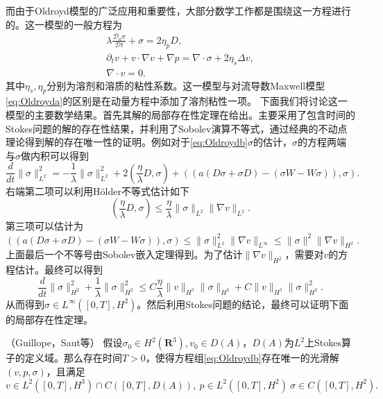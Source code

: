 而由于Oldroyd模型的广泛应用和重要性，大部分数学工作都是围绕这一方程进行的。这一模型的一般方程为
\begin{subequations}\label{eq:Oldroydb}
\begin{align}
	\lambda \frac{\mathcal{D}_a \sigma}{\mathcal{D} t} + \sigma = 2 \eta_p D, \\
	\partial_t v + v \cdot \nabla v  + \nabla p = \nabla \cdot \sigma + 2 \eta_s \Delta v, \\
	\nabla \cdot v = 0.
\end{align}
\end{subequations}
其中$\eta_s,\eta_p$分别为溶剂和溶质的粘性系数。这一模型与对流导数Maxwell模型\eqref{eq:Oldroyda}的区别是在动量方程中添加了溶剂粘性一项。
下面我们将讨论这一模型的主要数学结果。首先其解的局部存在性定理在\cite{guillope1990existence}给出。主要采用了包含时间的Stokes问题的解的存在性结果\cite{temam1995navier}，并利用了Sobolev演算不等式\cite{majda2012compressible}，通过经典的不动点理论得到解的存在唯一性的证明。例如对于\eqref{eq:Oldroydb}$\sigma$的估计，$\sigma$的方程两端与$\sigma$做内积可以得到
\begin{equation*}
	\frac{d}{dt} \|\sigma\|_{L^2}^2  =  -\frac{1}{\lambda} \|\sigma\|_{L^2}^2 + 2 (\frac{\eta}{\lambda} D, \sigma) + \left( (a(D \sigma + \sigma D) - (\sigma W -W \sigma)),\sigma \right).
\end{equation*}
右端第二项可以利用H\"older不等式估计如下
\begin{equation*}
	(\frac{\eta}{\lambda} D, \sigma) \le \frac{\eta}{\lambda} \|\sigma\|_{L^2} \|\nabla v\|_{L^2}.
\end{equation*}
第三项可以估计为
\begin{equation*}
	 \left( (a(D \sigma + \sigma D) - (\sigma W -W \sigma)),\sigma \right) \le \|\sigma\|_{L^2}^2 \|\nabla v\|_{L^\infty} \le \|\sigma\|^2 \|\nabla v\|_{H^2}
.
\end{equation*}
上面最后一个不等号由Sobolev嵌入定理得到。为了估计$\|\nabla v\|_{H^2}$，需要对$v$的方程估计。最终可以得到\cite{guillope1990existence}
\begin{equation*}
		\frac{d}{dt} \|\sigma\|_{H^2}^2 + \frac{1}{\lambda} \|\sigma\|_{H^2}^2 \le C \frac{\eta}{\lambda} \|v\|_{H^3} \|\sigma\|_{H^2} + C \|v\|_{H^3} \|\sigma\|_{H^2}^2.
\end{equation*}
从而得到$\sigma \in L^\infty([0,T],H^2)$。然后利用Stokes问题的结论，最终可以证明下面的局部存在性定理。
\begin{theorem}（Guillope，Saut等\cite{guillope1990existence,saut2012lectures}）
	假设$\sigma_0 \in H^2(\mathbf{R}^3),v_0 \in D(A)$，$D(A)$为$L^2$上Stokes算子的定义域。那么存在时间$T>0$，使得方程组\eqref{eq:Oldroydb}存在唯一的光滑解$(v,p,\sigma)$，且满足
	\begin{equation*}
		v \in L^2([0,T],H^3) \cap C([0,T],D(A)), \ p \in L^2([0,T],H^2) \ \sigma \in C([0,T],H^2).
	\end{equation*}
\end{theorem}
